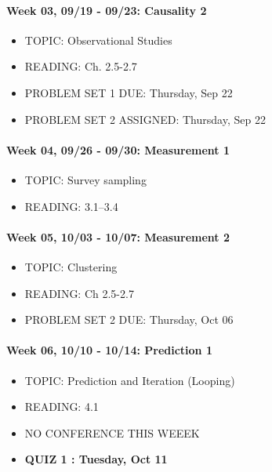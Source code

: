 \documentclass[11pt,]{article}
\begin{document}
\paragraph{Week 03, 09/19 - 09/23: Causality
2}\label{week-03-0919---0923-causality-2}

\begin{itemize}
\itemsep1pt\parskip0pt
\item
  TOPIC: Observational Studies
\item
  READING: Ch. 2.5-2.7
\item
  PROBLEM SET 1 DUE: Thursday, Sep 22
\item
  PROBLEM SET 2 ASSIGNED: Thursday, Sep 22
\end{itemize}

\paragraph{Week 04, 09/26 - 09/30: Measurement
1}\label{week-04-0926---0930-measurement-1}

\begin{itemize}
\itemsep1pt\parskip0pt
\item
  TOPIC: Survey sampling
\item
  READING: 3.1--3.4
\end{itemize}

\paragraph{Week 05, 10/03 - 10/07: Measurement
2}\label{week-05-1003---1007-measurement-2}

\begin{itemize}
\itemsep1pt\parskip0pt
\item
  TOPIC: Clustering
\item
  READING: Ch 2.5-2.7
\item
  PROBLEM SET 2 DUE: Thursday, Oct 06
\end{itemize}

\paragraph{Week 06, 10/10 - 10/14: Prediction
1}\label{week-06-1010---1014-prediction-1}

\begin{itemize}
\itemsep1pt\parskip0pt
\item
  TOPIC: Prediction and Iteration (Looping)
\item
  READING: 4.1
\item
  NO CONFERENCE THIS WEEEK
\item
  \textbf{QUIZ 1 : Tuesday, Oct 11}
\end{itemize}
\end{document}
